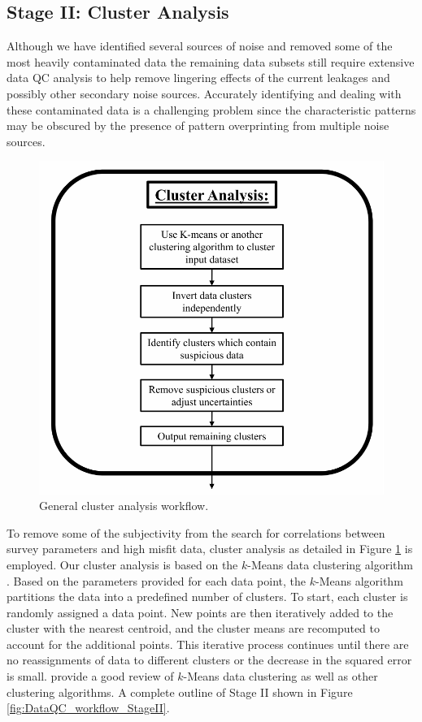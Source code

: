 \documentclass[final,authoryear,5p,times,twocolumn]{elsarticle}
\begin{document}
\subsection{Stage II: Cluster Analysis}
\label{Data_Quality_Control:StageII_Cluster_Analysis}

Although we have identified several sources of noise and removed some of the most heavily contaminated data the remaining data subsets still require extensive data QC analysis to help remove lingering effects of the current leakages and possibly other secondary noise sources. Accurately identifying and dealing with these contaminated data is a challenging problem since the characteristic patterns may be obscured by the presence of pattern overprinting from multiple noise sources.

\begin{figure} [!ht]
\begin{center}
   \includegraphics[trim=0cm 0cm 0cm 0cm, clip=true,width=0.75\linewidth]{./Figures/Fig10.pdf}
\end{center}
\caption{General cluster analysis workflow.}
\label{fig:DataQC_workflow_ClusterAnalysis}
\end{figure}

To remove some of the subjectivity from the search for correlations between survey parameters and high misfit data, cluster analysis as detailed in Figure \ref{fig:DataQC_workflow_ClusterAnalysis} is employed. Our cluster analysis is based on the $k$-Means data clustering algorithm \citep{MacQueen1967}. Based on the parameters provided for each data point, the $k$-Means algorithm partitions the data into a predefined number of clusters. To start, each cluster is randomly assigned a data point. New points are then iteratively added to the cluster with the nearest centroid, and the cluster means are recomputed to account for the additional points. This iterative process continues until there are no reassignments of data to different clusters or the decrease in the squared error is small. \cite{Jain1999} provide a good review of $k$-Means data clustering as well as other clustering algorithms. A complete outline of Stage II shown in Figure \ref{fig:DataQC_workflow_StageII}.
\end{document}

